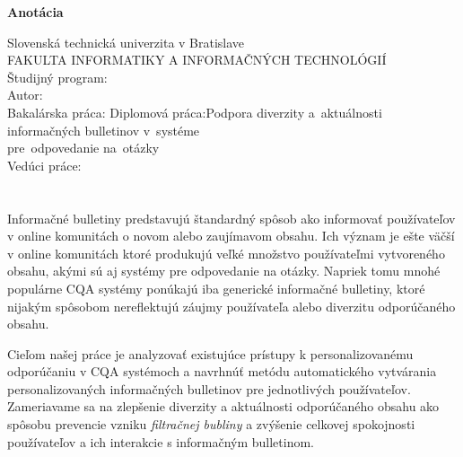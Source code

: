 \newpage
\thispagestyle{plain}
\begin{center}
\begin{Large}
\textbf{Anotácia} \\
\end{Large}
\end{center}
Slovenská technická univerzita v Bratislave
\vspace*{2mm}\\FAKULTA INFORMATIKY A INFORMAČNÝCH TECHNOLÓGIÍ
\vspace*{2mm}\\
\noindent
Študijný program:~\Program
\vspace*{2mm}\\
\noindent
Autor:\hspace*{21mm}\Author
\vspace*{2mm}\\
{
	{Bakalárska práca: }\Title
}
{
	{Diplomová práca:\hspace*{2mm}}Podpora diverzity a~aktuálnosti informačných bulletinov v~systéme\\
    \hspace*{32mm}pre~odpovedanie na~otázky
}
\vspace*{2mm}\\
Vedúci práce:\hspace*{9mm}\Supervisor
\vspace*{2mm}\\\Month \Year \\
\noindent
\\
Informačné bulletiny predstavujú štandardný spôsob ako informovať používateľov v online komunitách o novom alebo zaujímavom
obsahu. Ich význam je ešte väčší v online komunitách ktoré produkujú veľké množstvo používateľmi vytvoreného obsahu,
akými sú aj systémy pre odpovedanie na otázky.
Napriek tomu mnohé populárne CQA systémy ponúkajú iba generické informačné bulletiny, ktoré nijakým spôsobom nereflektujú
záujmy používateľa alebo diverzitu odporúčaného obsahu.


Cieľom našej práce je analyzovať existujúce prístupy k personalizovanému odporúčaniu v CQA systémoch a navrhnúť metódu
automatického vytvárania personalizovaných informačných bulletinov pre jednotlivých používateľov. Zameriavame sa na zlepšenie
diverzity a aktuálnosti odporúčaného obsahu ako spôsobu prevencie vzniku \emph{filtračnej bubliny} a zvýšenie celkovej
spokojnosti používateľov a ich interakcie s informačným bulletinom.

